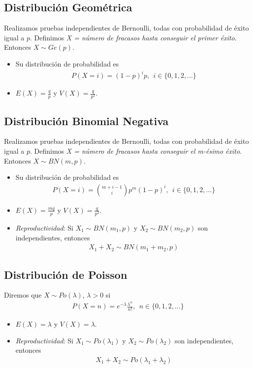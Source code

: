 \subsection{Distribución Geométrica}
Realizamos pruebas independientes de Bernoulli, todas con probabilidad de éxito igual a $p$. Definimos \textit{X = número de fracasos hasta conseguir el primer éxito}. Entonces $X \sim Ge(p)$.
\begin{itemize}
    \item Su distribución de probabilidad es
          \begin{align*}
              P(X = i) = (1-p)^i p, \ \ i \in \{0,1,2,...\}
          \end{align*}
    \item $E(X) = \frac{q}{p}$ y $V(X) = \frac{q}{p^2}$.
\end{itemize}

\subsection{Distribución Binomial Negativa}
Realizamos pruebas independientes de Bernoulli, todas con probabilidad de éxito igual a $p$. Definimos \textit{X = número de fracasos hasta conseguir el m-ésimo éxito}. Entonces $X \sim BN(m,p)$.
\begin{itemize}
    \item Su distribución de probabilidad es
          \begin{align*}
              P(X = i) = \binom{m+i-1}{i}p^m(1-p)^i, \ \ i \in \{0,1,2,...\}
          \end{align*}
    \item $E(X) = \frac{mq}{p}$ y $V(X) = \frac{q}{p^2}$.
    \item \textit{Reproductividad}: Si $X_1 \sim BN(m_1,p)$ y $X_2 \sim BN(m_2,p)$ son independientes, entonces
          \begin{align*}
              X_1 + X_2 \sim BN(m_1 + m_2,p)
          \end{align*}
\end{itemize}

\subsection{Distribución de Poisson}
Diremos que $X \sim Po(\lambda)$, $\lambda > 0$ si
\begin{align*}
    P(X = n) = e^{-\lambda}\frac{\lambda^n}{n!}, \ \ n \in \{0,1,2,...\}
\end{align*}
\begin{itemize}
    \item $E(X) = \lambda$ y $V(X) = \lambda$.
    \item \textit{Reproductividad}: Si $X_1 \sim Po(\lambda_1)$ y $X_2 \sim Po(\lambda_2)$ son independientes, entonces
          \begin{align*}
              X_1 + X_2 \sim Po(\lambda_1 + \lambda_2)
          \end{align*}
\end{itemize}

